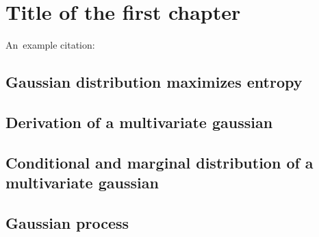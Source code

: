 \chapter{Title of the first chapter}

An~example citation: \cite{Andel07}

\section{Gaussian distribution maximizes entropy}

\section{Derivation of a multivariate gaussian}

\section{Conditional and marginal distribution of a multivariate gaussian}

\section{Gaussian process}

